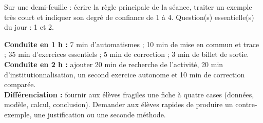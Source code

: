 \begin{exitticket}[3 minutes]Sur une demi-feuille : écrire la règle principale de la séance, traiter un exemple très court et indiquer son degré de confiance de 1 à 4. Question(s) essentielle(s) du jour : 1 et 2.\end{exitticket}

\ifmxteacher
\begin{method}
\textbf{Conduite en 1 h :} 7 min d'automatismes ; 10 min de mise en commun et trace ; 35 min d'exercices essentiels ; 5 min de correction ; 3 min de billet de sortie.\\
\textbf{Conduite en 2 h :} ajouter 20 min de recherche de l'activité, 20 min d'institutionnalisation, un second exercice autonome et 10 min de correction comparée.\\
\textbf{Différenciation :} fournir aux élèves fragiles une fiche à quatre cases (données, modèle, calcul, conclusion). Demander aux élèves rapides de produire un contre-exemple, une justification ou une seconde méthode.
\end{method}
\fi
